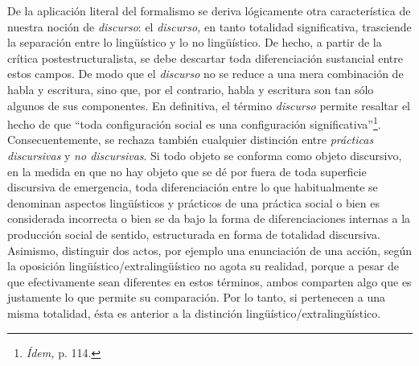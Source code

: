 De la aplicación literal del formalismo se deriva lógicamente otra característica de nuestra noción de \emph{discurso}: el \emph{discurso,} en tanto totalidad significativa, trasciende la separación entre lo lingüístico y lo no lingüístico. De hecho, a partir de la crítica postestructuralista, se debe descartar toda diferenciación sustancial entre estos campos. De modo que el \emph{discurso} no se reduce a una mera combinación de habla y escritura, sino que, por el contrario, habla y escritura son tan sólo algunos de sus componentes. En definitiva, el término \emph{discurso} permite resaltar el hecho de que \enquote{toda configuración social es una configuración significativa}\footnote{\emph{Ídem,} p. 114.}. Consecuentemente, se rechaza también cualquier distinción entre \emph{prácticas discursivas} y \emph{no discursivas}. Si todo objeto se conforma como objeto discursivo, en la medida en que no hay objeto que se dé por fuera de toda superficie discursiva de emergencia, toda diferenciación entre lo que habitualmente se denominan aspectos lingüísticos y prácticos de una práctica social o bien es considerada incorrecta o bien se da bajo la forma de diferenciaciones internas a la producción social de sentido, estructurada en forma de totalidad discursiva. Asimismo, distinguir dos actos, por ejemplo una enunciación de una acción, según la oposición lingüístico/extralingüístico no agota su realidad, porque a pesar de que efectivamente sean diferentes en estos términos, ambos comparten algo  que es justamente lo que permite su comparación. Por lo tanto, si pertenecen a una misma totalidad, ésta es anterior a la distinción lingüístico/extralingüístico.

